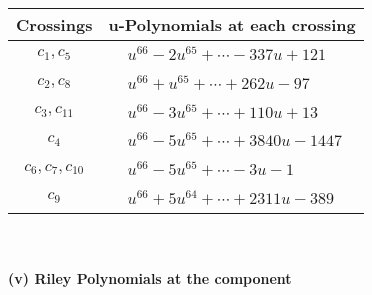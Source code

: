 \documentclass[1p]{elsarticle_modified}
\theoremstyle{definition}
\begin{document}
\begin{tabular}{m{50pt}|m{274pt}}
Crossings & \hspace{64pt}u-Polynomials at each crossing \\
\hline $$\begin{aligned}c_{1},c_{5}\end{aligned}$$&$\begin{aligned}
&u^{66}-2 u^{65}+\cdots-337 u+121
\end{aligned}$\\
\hline $$\begin{aligned}c_{2},c_{8}\end{aligned}$$&$\begin{aligned}
&u^{66}+u^{65}+\cdots+262 u-97
\end{aligned}$\\
\hline $$\begin{aligned}c_{3},c_{11}\end{aligned}$$&$\begin{aligned}
&u^{66}-3 u^{65}+\cdots+110 u+13
\end{aligned}$\\
\hline $$\begin{aligned}c_{4}\end{aligned}$$&$\begin{aligned}
&u^{66}-5 u^{65}+\cdots+3840 u-1447
\end{aligned}$\\
\hline $$\begin{aligned}c_{6},c_{7},c_{10}\end{aligned}$$&$\begin{aligned}
&u^{66}-5 u^{65}+\cdots-3 u-1
\end{aligned}$\\
\hline $$\begin{aligned}c_{9}\end{aligned}$$&$\begin{aligned}
&u^{66}+5 u^{64}+\cdots+2311 u-389
\end{aligned}$\\
\hline
\end{tabular}\\~\\
\newpage\renewcommand{\arraystretch}{1}
\flushleft \textbf{(v) Riley Polynomials at the component}\newline \\
\end{document}

